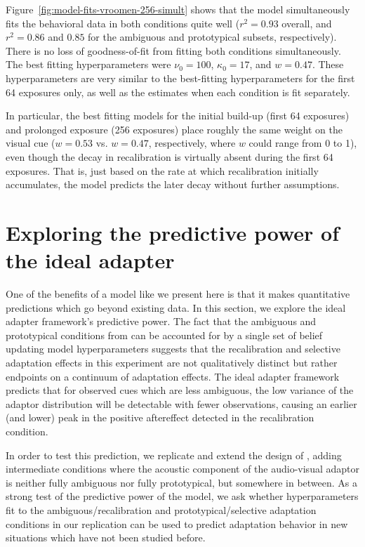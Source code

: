 Figure~\ref{fig:model-fits-vroomen-256-simult} shows that the model simultaneously fits the behavioral data in both conditions quite well ($r^2=0.93$ overall, and $r^2=0.86$ and $0.85$ for the ambiguous and prototypical subsets, respectively).  There is no loss of goodness-of-fit from fitting both conditions simultaneously.  The best fitting hyperparameters were $\nu_0 = 100$, $\kappa_0=17$, and $w=0.47$.  These hyperparameters are very similar to the best-fitting hyperparameters for the first 64 exposures only, as well as the estimates when each condition is fit separately.

In particular, the best fitting models for the initial build-up (first 64 exposures) and prolonged exposure (256 exposures) place roughly the same weight on the visual cue ($w=0.53$ vs. $w=0.47$, respectively, where $w$ could range from 0 to 1), even though the decay in recalibration is virtually absent during the first 64 exposures. That is, just based on the rate at which recalibration initially accumulates, the model predicts the later decay without further assumptions.


\section{Exploring the predictive power of the ideal adapter}
\label{sec:expl-pred-power}

One of the benefits of a model like we present here is that it makes quantitative predictions which go beyond existing data.  In this section, we explore the ideal adapter framework's predictive power.  The fact that the ambiguous and prototypical conditions from  can be accounted for by a single set of belief updating model hyperparameters suggests that the recalibration and selective adaptation effects in this experiment are not qualitatively distinct but rather endpoints on a continuum of adaptation effects.  The ideal adapter framework predicts that for observed cues which are less ambiguous, the low variance of the adaptor distribution will be detectable with fewer observations, causing an earlier (and lower) peak in the positive aftereffect detected in the recalibration condition.


In order to test this prediction, we replicate and extend the design of , adding intermediate conditions where the acoustic component of the audio-visual adaptor is neither fully ambiguous nor fully prototypical, but somewhere in between.  As a strong test of the predictive power of the model, we ask whether hyperparameters fit to the ambiguous/recalibration and prototypical/selective adaptation conditions in our replication can be used to predict adaptation behavior in new situations which have not been studied before.

